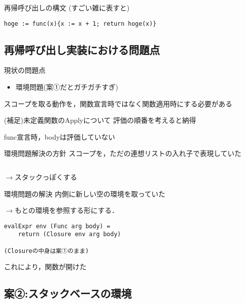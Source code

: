 \documentclass[uplatex,dvipdfmx,ja=standard]{beamer}
\begin{document}
\begin{frame}[fragile]{再帰呼び出しの構文}
    (すごい雑に表すと)
    \begin{verbatim}
hoge := func(x){x := x + 1; return hoge(x)}
    \end{verbatim}

\end{frame}

\subsection{再帰呼び出し実装における問題点}

\begin{frame}{現状の問題点}
    \begin{itemize}
        \item 環境問題(案①だとガチガチすぎ)
    \end{itemize}
スコープを取る動作を，関数宣言時ではなく関数適用時にする必要がある
\end{frame}

\begin{frame}{(補足)未定義関数のApplyについて}
評価の順番を考えると納得

func宣言時，bodyは評価していない
\end{frame}

\begin{frame}[fragile]{環境問題解決の方針}
    スコープを，ただの連想リストの入れ子で表現していた
    \begin{verbatim}
    \end{verbatim}
    $\to$スタックっぽくする
\end{frame}

\begin{frame}[fragile]{環境問題の解決}
    内側に新しい空の環境を取っていた

    $\to$もとの環境を参照する形にする．
    \begin{verbatim}
evalExpr env (Func arg body) = 
    return (Closure env arg body)

(Closureの中身は案①のまま)
    \end{verbatim}

    これにより，関数が開けた

\end{frame}

\subsection{案②:スタックベースの環境}
\end{document}
